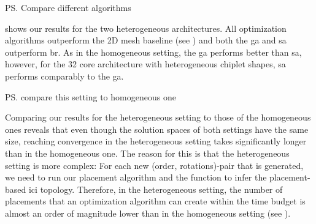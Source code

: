 \ps{Compare different algorithms}

 shows our results for the two heterogeneous architectures.
All optimization algorithms outperform the 2D mesh baseline (see ) and both the \gls{ga} and \gls{sa} outperform \gls{br}.
As in the homogeneous setting, the \gls{ga} performs better than \gls{sa}, however, for the 32 core architecture with heterogeneous chiplet shapes, \gls{sa} performs comparably to the \gls{ga}.





\ps{compare this setting to homogeneous one}

Comparing our results for the heterogeneous setting to those of the homogeneous ones reveals that even though the solution spaces of both settings have the same size, reaching convergence in the heterogeneous setting takes significantly longer than in the homogeneous one.
The reason for this is that the heterogeneous setting is more complex: For each new (order, rotations)-pair that is generated, we need to run our placement algorithm and the function to infer the placement-based \gls{ici} topology.
Therefore, in the heterogeneous setting, the number of placements that an optimization algorithm can create within the time budget is almost an order of magnitude lower than in the homogeneous setting (see ).



